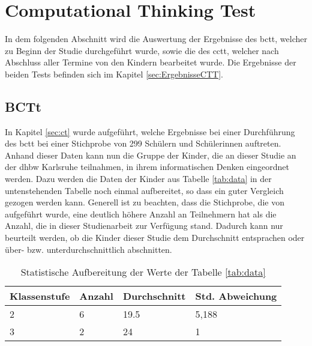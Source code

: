 \section{Computational Thinking Test}
	In dem folgenden Abschnitt wird die Auswertung der Ergebnisse des \acrshort{bctt}, welcher zu Beginn der Studie durchgeführt wurde, sowie die des \acrshort{cctt}, welcher nach Abschluss aller Termine von den Kindern bearbeitet wurde. Die Ergebnisse der beiden Tests befinden sich im Kapitel \ref{sec:ErgebnisseCTT}.
	\subsection{BCTt}
	In Kapitel \ref{sec:ct} wurde aufgeführt, welche Ergebnisse bei einer Durchführung des \acrshort{bctt} bei einer Stichprobe von 299 Schülern und Schülerinnen auftreten. Anhand dieser Daten kann nun die Gruppe der Kinder, die an dieser Studie an der \acrshort{dhbw} Karlsruhe teilnahmen, in ihrem informatischen Denken eingeordnet werden. Dazu werden die Daten der Kinder aus Tabelle \ref{tab:data} in der untenstehenden Tabelle noch einmal aufbereitet, so dass ein guter Vergleich gezogen werden kann. Generell ist zu beachten, dass die Stichprobe, die von \citeauthor{bcct} aufgeführt wurde, eine deutlich höhere Anzahl an Teilnehmern hat als die Anzahl, die in dieser Studienarbeit zur Verfügung stand. Dadurch kann nur beurteilt werden, ob die Kinder dieser Studie dem Durchschnitt entsprachen oder über- bzw. unterdurchschnittlich abschnitten.
	\begin{table}[H]
		\centering
		\begin{tabular}{|l|l|l|l|}
			\hline
			\rowcolor[HTML]{C0C0C0} 
			\textbf{Klassenstufe} & \textbf{Anzahl} & \textbf{Durchschnitt} & \textbf{Std. Abweichung} \\ \hline
			2                     & 6               & 19.5                  & 5,188                    \\ \hline
			3                     & 2               & 24                    & 1                        \\ \hline
		\end{tabular}
	\label{tab:statisticAufbereitung}
	\caption{Statistische Aufbereitung der Werte der Tabelle \ref{tab:data}}
	\end{table}

